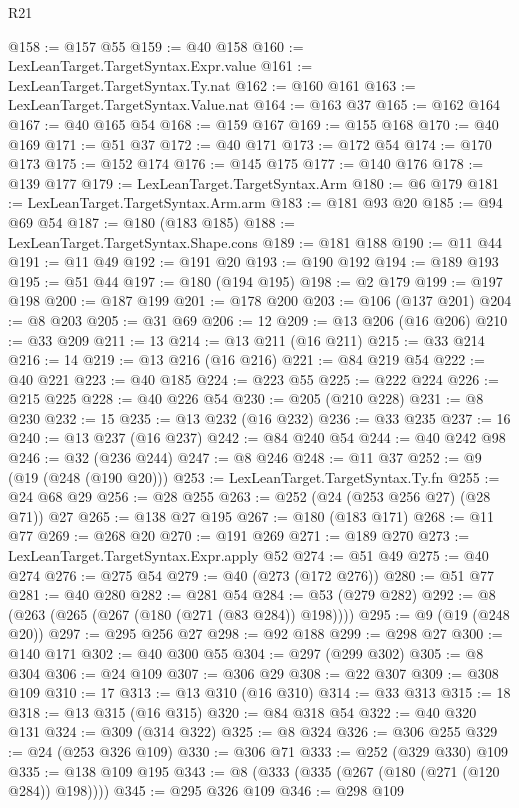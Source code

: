 \begin{lexlean}{R21}
\begin{coremodule}
@158 := @157 @55
@159 := @40 @158
@160 := LexLeanTarget.TargetSyntax.Expr.value
@161 := LexLeanTarget.TargetSyntax.Ty.nat
@162 := @160 @161
@163 := LexLeanTarget.TargetSyntax.Value.nat
@164 := @163 @37
@165 := @162 @164
@167 := @40 @165 @54
@168 := @159 @167
@169 := @155 @168
@170 := @40 @169
@171 := @51 @37
@172 := @40 @171
@173 := @172 @54
@174 := @170 @173
@175 := @152 @174
@176 := @145 @175
@177 := @140 @176
@178 := @139 @177
@179 := LexLeanTarget.TargetSyntax.Arm
@180 := @6 @179
@181 := LexLeanTarget.TargetSyntax.Arm.arm
@183 := @181 @93 @20
@185 := @94 @69 @54
@187 := @180 (@183 @185)
@188 := LexLeanTarget.TargetSyntax.Shape.cons
@189 := @181 @188
@190 := @11 @44
@191 := @11 @49
@192 := @191 @20
@193 := @190 @192
@194 := @189 @193
@195 := @51 @44
@197 := @180 (@194 @195)
@198 := @2 @179
@199 := @197 @198
@200 := @187 @199
@201 := @178 @200
@203 := @106 (@137 @201)
@204 := @8 @203
@205 := @31 @69
@206 := 12
@209 := @13 @206 (@16 @206)
@210 := @33 @209
@211 := 13
@214 := @13 @211 (@16 @211)
@215 := @33 @214
@216 := 14
@219 := @13 @216 (@16 @216)
@221 := @84 @219 @54
@222 := @40 @221
@223 := @40 @185
@224 := @223 @55
@225 := @222 @224
@226 := @215 @225
@228 := @40 @226 @54
@230 := @205 (@210 @228)
@231 := @8 @230
@232 := 15
@235 := @13 @232 (@16 @232)
@236 := @33 @235
@237 := 16
@240 := @13 @237 (@16 @237)
@242 := @84 @240 @54
@244 := @40 @242 @98
@246 := @32 (@236 @244)
@247 := @8 @246
@248 := @11 @37
@252 := @9 (@19 (@248 (@190 @20)))
@253 := LexLeanTarget.TargetSyntax.Ty.fn
@255 := @24 @68 @29
@256 := @28 @255
@263 := @252 (@24 (@253 @256 @27) (@28 @71)) @27
@265 := @138 @27 @195
@267 := @180 (@183 @171)
@268 := @11 @77
@269 := @268 @20
@270 := @191 @269
@271 := @189 @270
@273 := LexLeanTarget.TargetSyntax.Expr.apply @52
@274 := @51 @49
@275 := @40 @274
@276 := @275 @54
@279 := @40 (@273 (@172 @276))
@280 := @51 @77
@281 := @40 @280
@282 := @281 @54
@284 := @53 (@279 @282)
@292 := @8 (@263 (@265 (@267 (@180 (@271 (@83 @284)) @198))))
@295 := @9 (@19 (@248 @20))
@297 := @295 @256 @27
@298 := @92 @188
@299 := @298 @27
@300 := @140 @171
@302 := @40 @300 @55
@304 := @297 (@299 @302)
@305 := @8 @304
@306 := @24 @109
@307 := @306 @29
@308 := @22 @307
@309 := @308 @109
@310 := 17
@313 := @13 @310 (@16 @310)
@314 := @33 @313
@315 := 18
@318 := @13 @315 (@16 @315)
@320 := @84 @318 @54
@322 := @40 @320 @131
@324 := @309 (@314 @322)
@325 := @8 @324
@326 := @306 @255
@329 := @24 (@253 @326 @109)
@330 := @306 @71
@333 := @252 (@329 @330) @109
@335 := @138 @109 @195
@343 := @8 (@333 (@335 (@267 (@180 (@271 (@120 @284)) @198))))
@345 := @295 @326 @109
@346 := @298 @109

\end{coremodule}
\end{lexlean}
